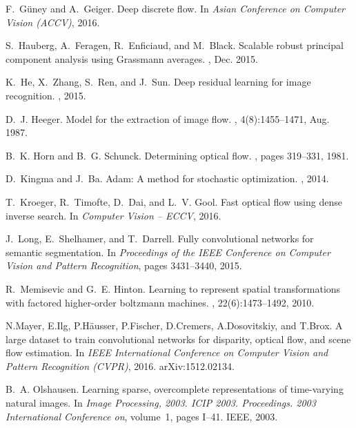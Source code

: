 \documentclass[10pt,twocolumn,letterpaper]{article}
\begin{document}
\begin{thebibliography}{10}
F.~G{\"u}ney and A.~Geiger.
\newblock Deep discrete flow.
\newblock In {\em Asian Conference on Computer Vision (ACCV)}, 2016.

S.~Hauberg, A.~Feragen, R.~Enficiaud, and M.~Black.
\newblock Scalable robust principal component analysis using {Grassmann}
  averages.
,
  Dec. 2015.

K.~He, X.~Zhang, S.~Ren, and J.~Sun.
\newblock Deep residual learning for image recognition.
, 2015.

D.~J. Heeger.
\newblock Model for the extraction of image flow.
, 4(8):1455--1471, Aug. 1987.

B.~K. Horn and B.~G. Schunck.
\newblock Determining optical flow.
, pages 319--331, 1981.

D.~Kingma and J.~Ba.
\newblock Adam: A method for stochastic optimization.
, 2014.

T.~Kroeger, R.~Timofte, D.~Dai, and L.~V. Gool.
\newblock Fast optical flow using dense inverse search.
\newblock In {\em Computer Vision -- ECCV}, 2016.

J.~Long, E.~Shelhamer, and T.~Darrell.
\newblock Fully convolutional networks for semantic segmentation.
\newblock In {\em Proceedings of the IEEE Conference on Computer Vision and
  Pattern Recognition}, pages 3431--3440, 2015.

R.~Memisevic and G.~E. Hinton.
\newblock Learning to represent spatial transformations with factored
  higher-order boltzmann machines.
, 22(6):1473--1492, 2010.

N.Mayer, E.Ilg, P.H{\"a}usser, P.Fischer, D.Cremers, A.Dosovitskiy, and T.Brox.
\newblock A large dataset to train convolutional networks for disparity,
  optical flow, and scene flow estimation.
\newblock In {\em IEEE International Conference on Computer Vision and Pattern
  Recognition (CVPR)}, 2016.
\newblock arXiv:1512.02134.

B.~A. Olshausen.
\newblock Learning sparse, overcomplete representations of time-varying natural
  images.
\newblock In {\em Image Processing, 2003. ICIP 2003. Proceedings. 2003
  International Conference on}, volume~1, pages I--41. IEEE, 2003.


\end{thebibliography}
\end{document}

